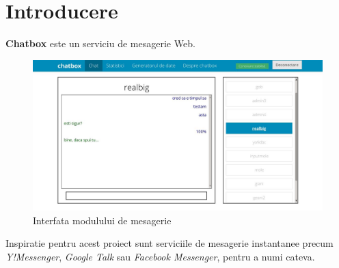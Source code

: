 \documentclass[12pt,a4paper]{article}
\begin{document}


\newpage
\section{Introducere}
\textbf{Chatbox} este un serviciu de mesagerie Web.

\begin{figure}[h]
\centering
\includegraphics[width=150mm]{img/over.jpg}
\caption{Interfata modulului de mesagerie \label{overflow}}
\end{figure}

\vspace{3mm}
Inspiratie pentru acest proiect sunt serviciile de mesagerie instantanee 
precum \textit{Y!Messenger}, \textit{Google Talk} sau 
\textit{Facebook Messenger}, pentru a numi cateva.
\vfill
\end{document}
